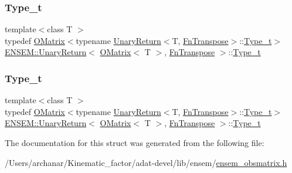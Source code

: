 \subsubsection{\texorpdfstring{Type\_t}{Type\_t}\hspace{0.1cm}{\footnotesize\ttfamily [2/3]}}
{\footnotesize\ttfamily template$<$class T $>$ \\
typedef \mbox{\hyperlink{classENSEM_1_1OMatrix}{O\+Matrix}}$<$typename \mbox{\hyperlink{structENSEM_1_1UnaryReturn}{Unary\+Return}}$<$T, \mbox{\hyperlink{structENSEM_1_1FnTranspose}{Fn\+Transpose}}$>$\+::\mbox{\hyperlink{structENSEM_1_1UnaryReturn_3_01OMatrix_3_01T_01_4_00_01FnTranspose_01_4_a5baf7be8d88ac60f5375088eb7463444}{Type\+\_\+t}}$>$ \mbox{\hyperlink{structENSEM_1_1UnaryReturn}{E\+N\+S\+E\+M\+::\+Unary\+Return}}$<$ \mbox{\hyperlink{classENSEM_1_1OMatrix}{O\+Matrix}}$<$ T $>$, \mbox{\hyperlink{structENSEM_1_1FnTranspose}{Fn\+Transpose}} $>$\+::\mbox{\hyperlink{structENSEM_1_1UnaryReturn_3_01OMatrix_3_01T_01_4_00_01FnTranspose_01_4_a5baf7be8d88ac60f5375088eb7463444}{Type\+\_\+t}}}

\mbox{\label{structENSEM_1_1UnaryReturn_3_01OMatrix_3_01T_01_4_00_01FnTranspose_01_4_a5baf7be8d88ac60f5375088eb7463444}} 
\subsubsection{\texorpdfstring{Type\_t}{Type\_t}\hspace{0.1cm}{\footnotesize\ttfamily [3/3]}}
{\footnotesize\ttfamily template$<$class T $>$ \\
typedef \mbox{\hyperlink{classENSEM_1_1OMatrix}{O\+Matrix}}$<$typename \mbox{\hyperlink{structENSEM_1_1UnaryReturn}{Unary\+Return}}$<$T, \mbox{\hyperlink{structENSEM_1_1FnTranspose}{Fn\+Transpose}}$>$\+::\mbox{\hyperlink{structENSEM_1_1UnaryReturn_3_01OMatrix_3_01T_01_4_00_01FnTranspose_01_4_a5baf7be8d88ac60f5375088eb7463444}{Type\+\_\+t}}$>$ \mbox{\hyperlink{structENSEM_1_1UnaryReturn}{E\+N\+S\+E\+M\+::\+Unary\+Return}}$<$ \mbox{\hyperlink{classENSEM_1_1OMatrix}{O\+Matrix}}$<$ T $>$, \mbox{\hyperlink{structENSEM_1_1FnTranspose}{Fn\+Transpose}} $>$\+::\mbox{\hyperlink{structENSEM_1_1UnaryReturn_3_01OMatrix_3_01T_01_4_00_01FnTranspose_01_4_a5baf7be8d88ac60f5375088eb7463444}{Type\+\_\+t}}}



The documentation for this struct was generated from the following file\+:\begin{DoxyCompactItemize}
\item 
/\+Users/archanar/\+Kinematic\+\_\+factor/adat-\/devel/lib/ensem/\mbox{\hyperlink{adat-devel_2lib_2ensem_2ensem__obsmatrix_8h}{ensem\+\_\+obsmatrix.\+h}}\end{DoxyCompactItemize}
